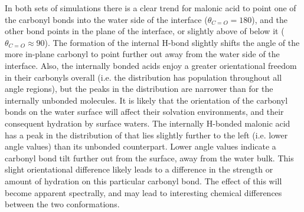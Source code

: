 In both sets of simulations there is a clear trend for malonic acid to point one of the carbonyl bonds into the water side of the interface ($\theta_{C=O}=180$\degr), and the other bond points in the plane of the interface, or slightly above of below it ($\theta_{C=O} \approx 90$\degr). The formation of the internal H-bond slightly shifts the angle of the more in-plane carbonyl to point further out away from the water side of the interface. Also, the internally bonded acids enjoy a greater orientational freedom in their carbonyls overall (i.e. the distribution has population throughout all angle regions), but the peaks in the distribution are narrower than for the internally unbonded molecules. It is likely that the orientation of the carbonyl bonds on the water surface will affect their solvation environments, and their consequent hydration by surface waters. The internally H-bonded malonic acid has a peak in the distribution of \thetacarb that lies slightly further to the left (i.e. lower angle values) than its unbonded counterpart. Lower angle values indicate a carbonyl bond tilt further out from the surface, away from the water bulk. This slight orientational difference likely leads to a difference in the strength or amount of hydration on this particular carbonyl bond. The effect of this will become apparent spectrally, and may lead to interesting chemical differences between the two conformations.
